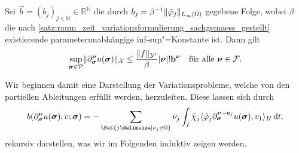 \begin{Satz}
\label{satz:abschaetzung_norm_partieller_ableitungen}
    Sei $\vec b = (b_j)_{j \in \mathbb{N}} \in \mathbb{R}^{\mathbb{N}}$ die durch $b_{j} = \beta^{-1} \lVert\tilde{\varphi}_{j}\rVert_{L_{\infty}(\Omega)}$ gegebene Folge, wobei $\beta$ die nach \cref{satz:raum_zeit_variationsformulierung_sachgemaess_gestellt} existierende parameterunabhängige inf-sup"=Konstante ist.
    Dann gilt
    \begin{equation}
        \label{eq:abschaetzung_norm_partieller_ableitungen}
        \sup_{\bm\sigma \in \mathcal P} \norm{\partial^{\bm\nu}_{\bm\sigma} u(\bm\sigma)}_{\mathcal X} \leq \frac{\norm{f}_{\mathcal Y'}}{\beta} \abs{\bm\nu}! \vec b^{\bm\nu} \quad \fa \bm \nu \in \mathcal F.
    \end{equation}

    \begin{Beweis}
        Wir beginnen damit eine Darstellung der Variationsprobleme, welche von den partiellen Ableitungen erfüllt werden, herzuleiten.
        Diese lassen sich durch
        \begin{equation}
        \label{eq:abschaetzung_norm_partieller_ableitungen:rekursiv}
            b(\partial^{\bm\nu}_{\bm\sigma} u(\bm\sigma), v; \bm\sigma)
            = - \sum_{\Set{j \given \nu_{j} \neq 0}} \nu_{j} \int_{I} \tilde{\chi}_{j} \skp{\tilde{\varphi}_{j} \partial^{\bm\nu - \vec e_{j}}_{\bm\sigma} u(\bm\sigma)}{v_{1}}{H} \diff t.
        \end{equation}
        rekursiv darstellen, was wir im Folgenden induktiv zeigen werden.


\end{Beweis}
\end{Satz}
